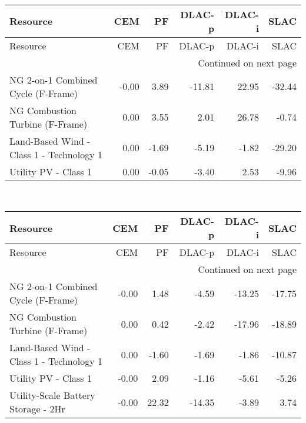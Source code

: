 \documentclass{article}
\begin{document}
\hline
{} \\
\hline
\begin{longtable}{lrrrrr}
\toprule
Resource & CEM & PF & DLAC-p & DLAC-i & SLAC \\
\midrule
\endfirsthead
\toprule
Resource & CEM & PF & DLAC-p & DLAC-i & SLAC \\
\midrule
\endhead
\midrule
\multicolumn{6}{r}{Continued on next page} \\
\midrule
\endfoot
\bottomrule
\endlastfoot
NG 2-on-1 Combined Cycle (F-Frame) & -0.00 & 3.89 & -11.81 & 22.95 & -32.44 \\
NG Combustion Turbine (F-Frame) & 0.00 & 3.55 & 2.01 & 26.78 & -0.74 \\
Land-Based Wind - Class 1 - Technology 1 & 0.00 & -1.69 & -5.19 & -1.82 & -29.20 \\
Utility PV - Class 1 & 0.00 & -0.05 & -3.40 & 2.53 & -9.96 \\
\end{longtable}


\hline
{} \\
\hline
\begin{longtable}{lrrrrr}
\toprule
Resource & CEM & PF & DLAC-p & DLAC-i & SLAC \\
\midrule
\endfirsthead
\toprule
Resource & CEM & PF & DLAC-p & DLAC-i & SLAC \\
\midrule
\endhead
\midrule
\multicolumn{6}{r}{Continued on next page} \\
\midrule
\endfoot
\bottomrule
\endlastfoot
NG 2-on-1 Combined Cycle (F-Frame) & -0.00 & 1.48 & -4.59 & -13.25 & -17.75 \\
NG Combustion Turbine (F-Frame) & 0.00 & 0.42 & -2.42 & -17.96 & -18.89 \\
Land-Based Wind - Class 1 - Technology 1 & 0.00 & -1.60 & -1.69 & -1.86 & -10.87 \\
Utility PV - Class 1 & -0.00 & 2.09 & -1.16 & -5.61 & -5.26 \\
Utility-Scale Battery Storage - 2Hr & -0.00 & 22.32 & -14.35 & -3.89 & 3.74 \\
\end{longtable}
\end{document}
